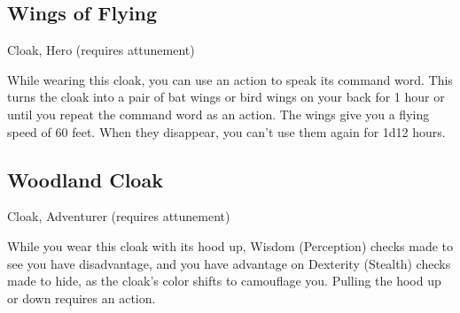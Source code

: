 \subsection{Wings of Flying}
Cloak, Hero (requires attunement) 

While wearing this cloak, you can use an action to speak its command word. This turns the cloak into a pair of bat wings or bird wings on your back for 1 hour or until you repeat the command word as an action. The wings give you a flying speed of 60 feet. When they disappear, you can't use them again for 1d12 hours.

\subsection{Woodland Cloak}
Cloak, Adventurer (requires attunement) 

While you wear this cloak with its hood up, Wisdom (Perception) checks made to see you have disadvantage, and you have advantage on Dexterity (Stealth) checks made to hide, as the cloak's color shifts to camouflage you. Pulling the hood up or down requires an action.
